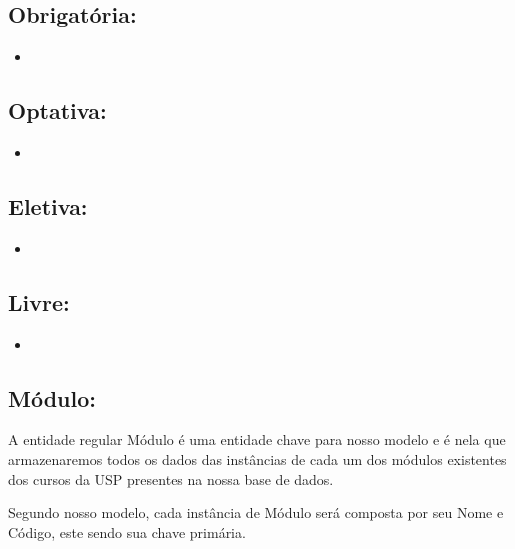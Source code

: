 \documentclass{report}
\begin{document}
\subsection{Obrigatória:}	
\begin{itemize}
  \item 
\end{itemize}
\subsection{Optativa:}	
\begin{itemize}
 \item
\end{itemize}
\subsection{Eletiva:}
\begin{itemize}
  \item
\end{itemize}
\subsection{Livre:}
\begin{itemize}
  \item
\end{itemize}
\fi
\subsection{Módulo:}
A entidade regular Módulo é uma entidade chave para nosso modelo e é nela que armazenaremos todos os dados das instâncias de cada um dos módulos existentes dos cursos da USP presentes na nossa base de dados.
	
	Segundo nosso modelo, cada instância de Módulo será composta por seu Nome e Código, este sendo sua chave primária.
		
\end{document}
